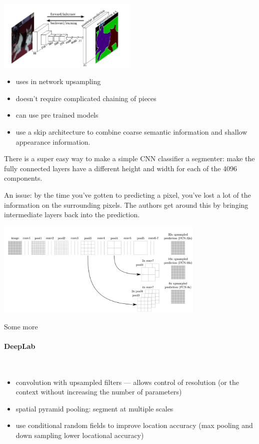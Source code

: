 \documentclass[12pt, a4paper, oneside, headinclude, footinclude]{article}
\begin{document}
\includegraphics[width=0.5\textwidth]{Figures/long-segmentation.png}
\begin{itemize}
    \item uses in network upsampling
    \item doesn't require complicated chaining of pieces
    \item can use pre trained models
    \item use a skip architecture to combine coarse semantic information and shallow
appearance information.
\end{itemize}
There is a super easy way to make a simple CNN classifier a segmenter: make
the fully connected layers have a different height and width for each of the
4096 components.

An issue: by the time you've gotten to predicting a pixel, you've lost a lot
of the information on the surrounding pixels. The authors get around this by
bringing intermediate layers back into the prediction.

\includegraphics[width=0.75\textwidth]{Figures/skip-segmentation.png}

Some more~\cite{chen2018, NIPS2015_5852}

\paragraph{DeepLab}~\cite{chen2018}

\begin{itemize}
    \item convolution with upsampled filters --- allows control of resolution
        (or the context without increasing the number of parameters)
    \item spatial pyramid pooling: segment at multiple scales
    \item use conditional random fields to improve location accuracy (max
        pooling and down sampling lower locational accuracy)
\end{itemize}
\end{document}
